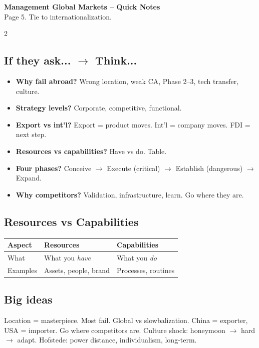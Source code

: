 \documentclass[10pt,landscape,a4paper]{article}
\begin{document}
\newpage
\begin{center}
{\LARGE\bfseries\color{accent} Management Global Markets -- Quick Notes}\\[0.3em]
\small Page 5. Tie to internationalization.
\end{center}
\vspace{0.5em}
\begin{multicols}{2}
\subsection*{\color{accent} If they ask... $\to$ Think...}
\begin{itemize}[leftmargin=*,nosep]
\item \textbf{Why fail abroad?} Wrong location, weak CA, Phase 2--3, tech transfer, culture.
\item \textbf{Strategy levels?} Corporate, competitive, functional.
\item \textbf{Export vs int'l?} Export = product moves. Int'l = company moves. FDI = next step.
\item \textbf{Resources vs capabilities?} Have vs do. Table.
\item \textbf{Four phases?} Conceive $\to$ Execute (critical) $\to$ Establish (dangerous) $\to$ Expand.
\item \textbf{Why competitors?} Validation, infrastructure, learn. Go where they are.
\end{itemize}

\subsection*{\color{accent} Resources vs Capabilities}
\begin{center}
\small
\begin{tabular}{@{}lll@{}}
\toprule
\textbf{Aspect} & \textbf{Resources} & \textbf{Capabilities} \\
\midrule
What & What you \textit{have} & What you \textit{do} \\
Examples & Assets, people, brand & Processes, routines \\
\bottomrule
\end{tabular}
\end{center}

\subsection*{\color{accent} Big ideas}
Location = masterpiece. Most fail. Global vs slowbalization. China = exporter, USA = importer. Go where competitors are. Culture shock: honeymoon $\to$ hard $\to$ adapt. Hofstede: power distance, individualism, long-term.


\end{multicols}
\end{document}
